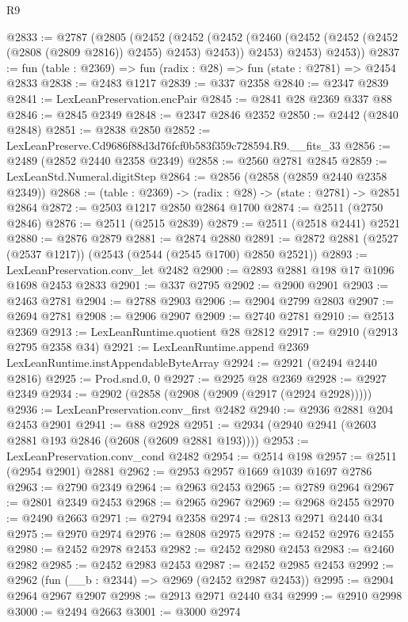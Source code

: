 \begin{lexlean}{R9}
\begin{coremodule}
@2833 := @2787
    (@2805
      (@2452
        (@2452
          (@2452 (@2460 (@2452 (@2452 (@2452 (@2808 (@2809 @2816)) @2455) @2453) @2453)) @2453)
          @2453)
        @2453))
@2837 := fun (table : @2369) => fun (radix : @28) => fun (state : @2781) => @2454 @2833
@2838 := @2483 @1217
@2839 := @337 @2358
@2840 := @2347 @2839
@2841 := LexLeanPreservation.encPair
@2845 := @2841 @28 @2369 @337 @88
@2846 := @2845 @2349
@2848 := @2347 @2846 @2352
@2850 := @2442 (@2840 @2848)
@2851 := @2838 @2850
@2852 := LexLeanPreserve.Cd9686f88d3d76fcf0b583f359c728594.R9.__fits_33
@2856 := @2489 (@2852 @2440 @2358 @2349)
@2858 := @2560 @2781 @2845
@2859 := LexLeanStd.Numeral.digitStep
@2864 := @2856 (@2858 (@2859 @2440 @2358 @2349))
@2868 := (table : @2369) -> (radix : @28) -> (state : @2781) -> @2851 @2864
@2872 := @2503 @1217 @2850 @2864 @1700
@2874 := @2511 (@2750 @2846)
@2876 := @2511 (@2515 @2839)
@2879 := @2511 (@2518 @2441) @2521
@2880 := @2876 @2879
@2881 := @2874 @2880
@2891 := @2872 @2881 (@2527 (@2537 @1217)) (@2543 (@2544 (@2545 @1700) @2850 @2521))
@2893 := LexLeanPreservation.conv_let @2482
@2900 := @2893 @2881 @198 @17 @1096 @1698 @2453 @2833
@2901 := @337 @2795
@2902 := @2900 @2901
@2903 := @2463 @2781
@2904 := @2788 @2903
@2906 := @2904 @2799 @2803
@2907 := @2694 @2781
@2908 := @2906 @2907
@2909 := @2740 @2781
@2910 := @2513 @2369
@2913 := LexLeanRuntime.quotient @28 @2812
@2917 := @2910 (@2913 @2795 @2358 @34)
@2921 := LexLeanRuntime.append @2369 LexLeanRuntime.instAppendableByteArray
@2924 := @2921 (@2494 @2440 @2816)
@2925 := Prod.snd.{0, 0}
@2927 := @2925 @28 @2369
@2928 := @2927 @2349
@2934 := @2902 (@2858 (@2908 (@2909 (@2917 (@2924 @2928)))))
@2936 := LexLeanPreservation.conv_first @2482
@2940 := @2936 @2881 @204 @2453 @2901
@2941 := @88 @2928
@2951 := @2934 (@2940 @2941 (@2603 @2881 @193 @2846 (@2608 (@2609 @2881 @193))))
@2953 := LexLeanPreservation.conv_cond @2482
@2954 := @2514 @198
@2957 := @2511 (@2954 @2901) @2881
@2962 := @2953 @2957 @1669 @1039 @1697 @2786
@2963 := @2790 @2349
@2964 := @2963 @2453
@2965 := @2789 @2964
@2967 := @2801 @2349 @2453
@2968 := @2965 @2967
@2969 := @2968 @2455
@2970 := @2490 @2663
@2971 := @2794 @2358
@2974 := @2813 @2971 @2440 @34
@2975 := @2970 @2974
@2976 := @2808 @2975
@2978 := @2452 @2976 @2455
@2980 := @2452 @2978 @2453
@2982 := @2452 @2980 @2453
@2983 := @2460 @2982
@2985 := @2452 @2983 @2453
@2987 := @2452 @2985 @2453
@2992 := @2962 (fun (__b : @2344) => @2969 (@2452 @2987 @2453))
@2995 := @2904 @2964 @2967 @2907
@2998 := @2913 @2971 @2440 @34
@2999 := @2910 @2998
@3000 := @2494 @2663
@3001 := @3000 @2974

\end{coremodule}
\end{lexlean}
